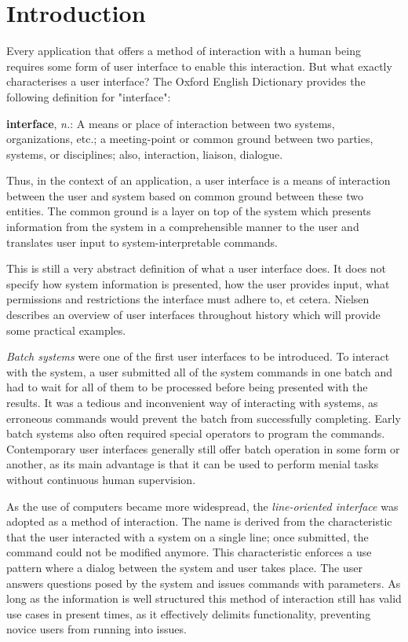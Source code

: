 \chapter{Introduction}
\label{chapter:introduction}
Every application that offers a method of interaction with a human being requires some form of user interface to enable this interaction. But what exactly characterises a user interface? The Oxford English Dictionary provides the following definition for "interface"\cite{inter87:online}:
\begin{displayquote}
\textbf{in\textperiodcentered ter\textperiodcentered face}, \textit{n.}: A means or place of interaction between two systems, organizations, etc.; a meeting-point or common ground between two parties, systems, or disciplines; also, interaction, liaison, dialogue.
\end{displayquote}

Thus, in the context of an application, a user interface is a means of interaction between the user and system based on common ground between these two entities. The common ground is a layer on top of the system which presents information from the system in a comprehensible manner to the user and translates user input to system-interpretable commands.

This is still a very abstract definition of what a user interface does. It does not specify how system information is presented, how the user provides input, what permissions and restrictions the interface must adhere to, et cetera. Nielsen\cite{nielsen1994usability} describes an overview of user interfaces throughout history which will provide some practical examples.

\textit{Batch systems} were one of the first user interfaces to be introduced. To interact with the system, a user submitted all of the system commands in one batch and had to wait for all of them to be processed before being presented with the results. It was a tedious and inconvenient way of interacting with systems, as erroneous commands would prevent the batch from successfully completing. Early batch systems also often required special operators to program the commands. Contemporary user interfaces generally still offer batch operation in some form or another, as its main advantage is that it can be used to perform menial tasks without continuous human supervision.

As the use of computers became more widespread, the \textit{line-oriented interface} was adopted as a method of interaction. The name is derived from the characteristic that the user interacted with a system on a single line; once submitted, the command could not be modified anymore. This characteristic enforces a use pattern where a dialog between the system and user takes place. The user answers questions posed by the system and issues commands with parameters. As long as the information is well structured this method of interaction still has valid use cases in present times, as it effectively delimits functionality, preventing novice users from running into issues.

